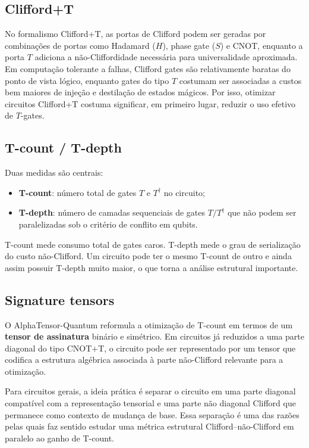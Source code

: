 \documentclass[a4paper,11pt]{article}
\begin{document}
\subsection*{Clifford+T}

No formalismo Clifford+T, as portas de Clifford podem ser geradas por combinações de portas como Hadamard ($H$), phase gate ($S$) e CNOT, enquanto a porta $T$ adiciona a não-Cliffordidade necessária para universalidade aproximada. Em computação tolerante a falhas, Clifford gates são relativamente baratas do ponto de vista lógico, enquanto gates do tipo $T$ costumam ser associadas a custos bem maiores de injeção e destilação de estados mágicos. Por isso, otimizar circuitos Clifford+T costuma significar, em primeiro lugar, reduzir o uso efetivo de $T$-gates.

\subsection*{T-count / T-depth}

Duas medidas são centrais:
\begin{itemize}
  \item \textbf{T-count}: número total de gates $T$ e $T^\dagger$ no circuito;
  \item \textbf{T-depth}: número de camadas sequenciais de gates $T/T^\dagger$ que não podem ser paralelizadas sob o critério de conflito em qubits.
\end{itemize}

T-count mede consumo total de gates caros. T-depth mede o grau de serialização do custo não-Clifford. Um circuito pode ter o mesmo T-count de outro e ainda assim possuir T-depth muito maior, o que torna a análise estrutural importante.

\subsection*{Signature tensors}

O AlphaTensor-Quantum reformula a otimização de T-count em termos de um \textbf{tensor de assinatura} binário e simétrico. Em circuitos já reduzidos a uma parte diagonal do tipo CNOT+T, o circuito pode ser representado por um tensor que codifica a estrutura algébrica associada à parte não-Clifford relevante para a otimização.

Para circuitos gerais, a ideia prática é separar o circuito em uma parte diagonal compatível com a representação tensorial e uma parte não diagonal Clifford que permanece como contexto de mudança de base. Essa separação é uma das razões pelas quais faz sentido estudar uma métrica estrutural Clifford--não-Clifford em paralelo ao ganho de T-count.
\end{document}
